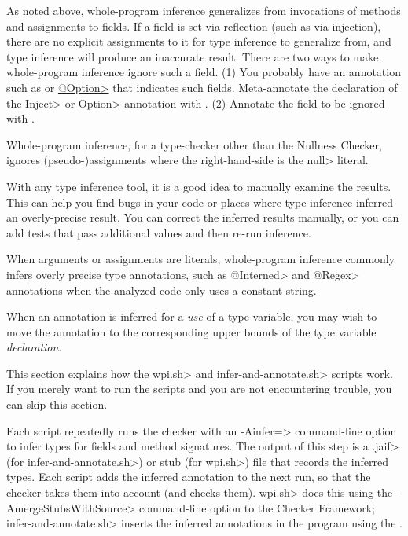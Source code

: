 As noted above, whole-program inference generalizes from invocations of methods and
assignments to fields.  If a field is set via
reflection (such as via injection), there are no explicit assignments to it
for type inference to generalize from, and type inference will produce
an inaccurate result.  There are two ways to make whole-program inference
ignore such a field.
%
(1)
You probably have an annotation such as
or
\href{https://types.cs.washington.edu/plume-lib/api/plume/Option.html}{\<@Option>}
that indicates such fields.  Meta-annotate the declaration of the \<Inject>
or \<Option> annotation with
.
%
(2)
Annotate the field to be ignored with
.

Whole-program inference, for a type-checker other than the Nullness Checker,
ignores (pseudo-)assignments where the right-hand-side is the \<null> literal.



With any type inference tool, it is a good idea to manually examine the
results.  This can help you find bugs in your code or places where type
inference inferred an overly-precise result.
You can correct the inferred results manually, or you can
add tests that pass additional values and then re-run inference.

When arguments or assignments are literals, whole-program inference
commonly infers overly precise type annotations, such as \<@Interned> and
\<@Regex> annotations when the analyzed code only uses a constant string.

When an annotation is inferred for a \emph{use} of a type variable,
you may wish to move the annotation
to the corresponding upper bounds of the type variable \emph{declaration}.



This section explains how the \<wpi.sh> and \<infer-and-annotate.sh> scripts work.  If you
merely want to run the scripts and you are not encountering trouble, you can
skip this section.

Each script repeatedly runs the checker with an \<-Ainfer=> command-line option to infer
types for fields and method signatures.  The output of this step
is a \<.jaif> (for \<infer-and-annotate.sh>) or stub (for \<wpi.sh>) file that records the inferred types.
Each script adds the inferred annotation to the next run, so that the checker takes them into
account (and checks them). \<wpi.sh> does this using the \<-AmergeStubsWithSource> command-line
option to the Checker Framework; \<infer-and-annotate.sh> inserts the inferred annotations in the program using the
.

